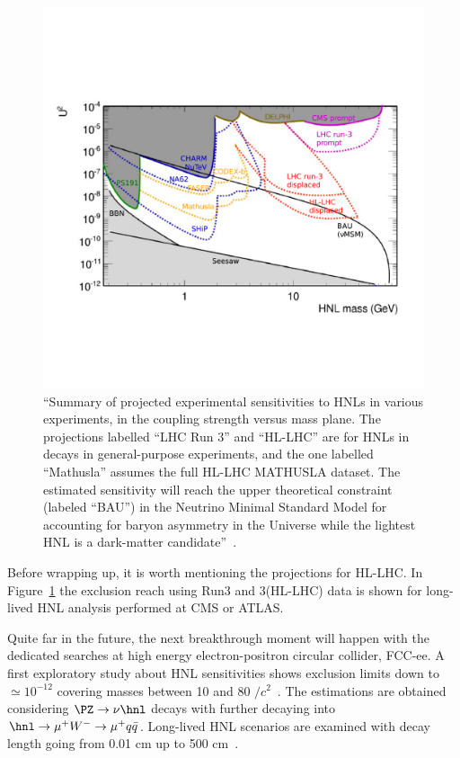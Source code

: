 \begin{figure}[h]
\centering
    \includegraphics[clip,trim=0.5cm 3.5cm 1.cm 4.3cm, width=.78\textwidth]{Figures/c7/projection_alimena.pdf}
\caption{``Summary of projected experimental sensitivities to HNLs in various
experiments, in the coupling strength \mixpar versus mass
plane. The projections labelled ``LHC Run 3'' and ``HL-LHC'' are for HNLs in \PW decays
in general-purpose experiments, and the one labelled ``Mathusla'' assumes the full HL-LHC
MATHUSLA dataset. The estimated sensitivity will reach the upper theoretical
constraint (labeled ``BAU'') in the Neutrino Minimal Standard Model
for accounting for baryon asymmetry in the Universe
while the lightest HNL is a dark-matter
candidate''~\cite{Alimena_2020}.}
\label{fig:HL_alimena}
\end{figure}

Before wrapping up, it is worth mentioning the projections for
HL-LHC. In Figure~\ref{fig:HL_alimena} the exclusion reach using Run3
and 3\abinv (HL-LHC) data is shown for long-lived HNL analysis
performed at CMS or ATLAS. 

Quite far in the future, the next breakthrough moment will happen with the
dedicated searches at high energy electron-positron circular collider,
FCC-ee. A first exploratory study about HNL sensitivities shows exclusion limits
down to \mixpar $\simeq 10^{-12}$ covering \hnl masses between 10 and
80 \GeV$/c^2$~\cite{blondel2014search}. The estimations are obtained
considering $\PZ \rightarrow \nu \hnl$ decays with \hnl further
decaying into
$\hnl \rightarrow \mu^{+} W^{-} \rightarrow \mu^{+}
q\bar{q}$. Long-lived HNL scenarios are examined with decay length
going from 0.01 cm up to 500 cm~\cite{blondel2014search}.\\


